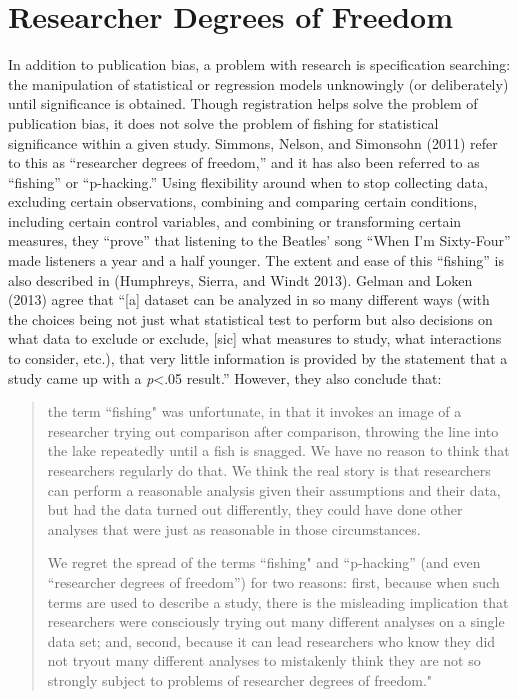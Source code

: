 \documentclass[12pt] {article}
\begin{document}
\section{Researcher Degrees of
Freedom}\label{rdof}

In addition to publication bias, a problem with research is
specification searching: the manipulation of statistical or regression
models unknowingly (or deliberately) until significance is obtained.
Though registration helps solve the problem of publication bias, it does
not solve the problem of fishing for statistical significance within a
given study. Simmons, Nelson, and Simonsohn (2011) refer to this as
``researcher degrees of freedom,'' and it has also been referred to as
``fishing'' or ``p-hacking.'' Using flexibility around when to stop
collecting data, excluding certain observations, combining and comparing
certain conditions, including certain control variables, and combining
or transforming certain measures, they ``prove'' that listening to the
Beatles' song ``When I'm Sixty-Four'' made listeners a year and a half
younger. The extent and ease of this ``fishing'' is also described in
(Humphreys, Sierra, and Windt 2013). Gelman and Loken (2013) agree that
``{[}a{]} dataset can be analyzed in so many different ways (with the
choices being not just what statistical test to perform but also
decisions on what data to exclude or exclude, {[}sic{]} what measures to
study, what interactions to consider, etc.), that very little
information is provided by the statement that a study came up with a
\emph{p}\textless{}.05 result.'' However, they also conclude that:

\begin{quote}
the term ``fishing" was unfortunate, in that it invokes an image of a
researcher trying out comparison after comparison, throwing the line
into the lake repeatedly until a fish is snagged. We have no reason to
think that researchers regularly do that. We think the real story is
that researchers can perform a reasonable analysis given their
assumptions and their data, but had the data turned out differently,
they could have done other analyses that were just as reasonable in
those circumstances.

We regret the spread of the terms ``fishing" and ``p-hacking'' (and even
``researcher degrees of freedom'') for two reasons: first, because when
such terms are used to describe a study, there is the misleading
implication that researchers were consciously trying out many different
analyses on a single data set; and, second, because it can lead
researchers who know they did not tryout many different analyses to
mistakenly think they are not so strongly subject to problems of
researcher degrees of freedom."
\end{quote}
\end{document}
